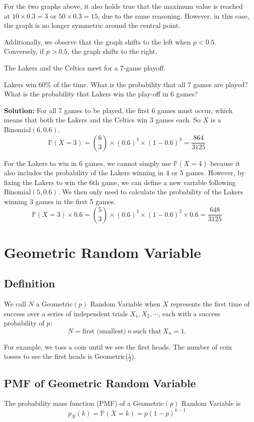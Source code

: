 For the two graphs above, it also holds true that the maximum value is reached at \(10 \times 0.3 = 3\) or \(50 \times 0.3 = 15\), due to the same reasoning. However, in this case, the graph is no longer symmetric around the central point.

Additionally, we observe that the graph shifts to the left when \(p < 0.5\). Conversely, if \(p > 0.5\), the graph shifts to the right.

\begin{eg}
The Lakers and the Celtics meet for a 7-game playoff. 

Lakers win 60\% of the time. What is the probability that all 7 games are played? What is the probability that Lakers win the play-off in 6 games? 

\textbf{Solution:} 
For all 7 games to be played, the first 6 games must occur, which means that both the Lakers and the Celtics win 3 games each. So \(X\) is a Binomial\((6, 0.6)\). 
\[
  \mathbb{P}(X = 3) = \binom{6}{3} \times (0.6)^3 \times (1 - 0.6)^3 = \dfrac{864}{3125}
\]

For the Lakers to win in 6 games, we cannot simply use \(\mathbb{P}(X = 4)\) because it also includes the probability of the Lakers winning in 4 or 5 games. However, by fixing the Lakers to win the 6th game, we can define a new variable following Binomial\((5, 0.6)\). We then only need to calculate the probability of the Lakers winning 3 games in the first 5 games.
\[
  \mathbb{P}(X = 3) \times 0.6 = \binom{5}{3} \times (0.6)^3 \times (1 - 0.6)^2 \times 0.6 = \dfrac{648}{3125}
\]
\end{eg}

\section{Geometric Random Variable}
\subsection{Definition}
We call \(N\) a Geometric\((p)\) Random Variable when \(X\) represents the first time of success over a series of independent trials \(X_1, X_2, \cdots\), each with a success probability of \(p\):
\[
  N = \text{first (smallest)}\ n\ \text{such that}\ X_n = 1.
\]

For example, we toss a coin until we see the first heads. The number of coin tosses to see the first heads is Geometric(\(\frac{1}{2}\)). 

\subsection{PMF of Geometric Random Variable}
The probability mass function (PMF) of a Geometric\((p)\) Random Variable is 
\[
  p_X (k) = \mathbb{P}(X = k) = p(1 - p)^{k-1} 
\]

